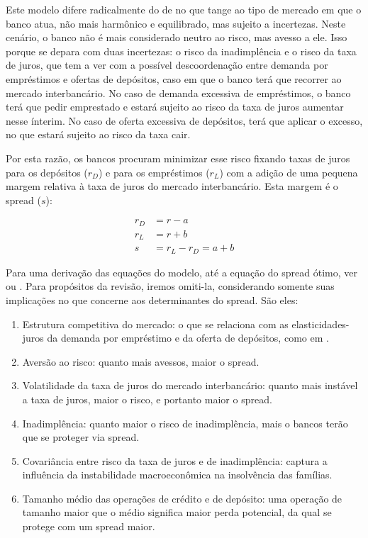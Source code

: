 \documentclass[a4paper,
               article,
               12pt,
               openany,
               oneside,
               english,
               brazil]{abntex2}
\numberwithin{equation}{section}
\begin{document}
    Este modelo difere radicalmente do de \textcite{klein} no que tange ao tipo de mercado em que o banco atua, não mais harmônico e equilibrado, mas sujeito a incertezas. Neste cenário, o banco não é mais considerado neutro ao risco, mas avesso a ele. Isso porque se depara com duas incertezas: o risco da inadimplência e o risco da taxa de juros, que tem a ver com a possível descoordenação entre demanda por empréstimos e ofertas de depósitos, caso em que o banco terá que recorrer ao mercado interbancário. No caso de demanda excessiva de empréstimos, o banco terá que pedir emprestado e estará sujeito ao risco da taxa de juros aumentar nesse ínterim. No caso de oferta excessiva de depósitos, terá que aplicar o excesso, no que estará sujeito ao risco da taxa cair. \textcite[p.~2262]{maudos}

    Por esta razão, os bancos procuram minimizar esse risco fixando taxas de juros para os depósitos ($r_D$) e para os empréstimos ($r_L$) com a adição de uma pequena margem relativa à taxa de juros do mercado interbancário. Esta margem é o spread ($s$):

	\begin{align}
        r_D &= r - a \\
        r_L &= r + b \\
        s &= r_L - r_D = a + b
	\end{align}

    Para uma derivação das equações do modelo, até a equação do spread ótimo, ver \textcite[p.~2262]{maudos} ou \textcite[p.~584]{hoesaunders}. Para propósitos da revisão, iremos omiti-la, considerando somente suas implicações no que concerne aos determinantes do spread. São eles:

	\begin{enumerate}
		\item Estrutura competitiva do mercado: o que se relaciona com as elasticidades-juros da demanda por empréstimo e da oferta de depósitos, como em \textcite{klein}.
		\item Aversão ao risco: quanto mais avessos, maior o spread.
		\item Volatilidade da taxa de juros do mercado interbancário: quanto mais instável a taxa de juros, maior o risco, e portanto maior o spread.
		\item Inadimplência: quanto maior o risco de inadimplência, mais o bancos terão que se proteger via spread.
		\item Covariância entre risco da taxa de juros e de inadimplência: captura a influência da instabilidade macroeconômica na insolvência das famílias.
		\item Tamanho médio das operações de crédito e de depósito: uma operação de tamanho maior que o médio significa maior perda potencial, da qual se protege com um spread maior.
	\end{enumerate}
\end{document}
